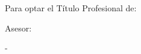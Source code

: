 \begin{titlepage}
{\begin{adjustwidth}{0.52\textwidth}{}
        \vfill\vspace{0.3cm}\par
        
        {
        \noindent Para optar el Título Profesional de:\par
        \noindent \VarGrado \par
        }
        
        \vfill\vspace{0.3cm}\par
        
        {
        \noindent Asesor:\par
        \noindent \VarAsesor \par
        }
    \end{adjustwidth}
    }

    \vfill\vspace{0.3cm}

    {
    
    \begin{center}
        \fontsize{11}{11}\selectfont
        \VarCiudad - \VarPais\par
        \VarAnio\par
    \end{center}
    }
\end{titlepage}